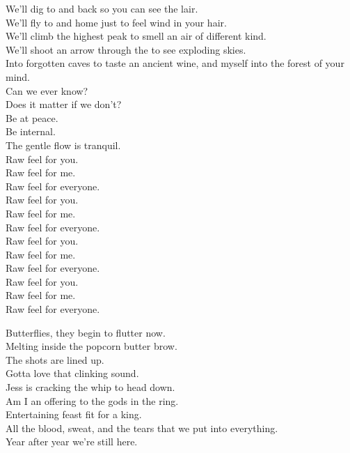 We'll dig to  and back so you can see the  lair. \\
We'll fly to  and home just to feel wind in your hair. \\
We'll climb the highest peak to smell an air of different kind. \\
We'll shoot an arrow through the  to see exploding skies. \\
Into forgotten caves to taste an ancient wine, and  myself into the forest of your mind. \\
Can we ever know? \\
Does it matter if we don't? \\
Be at peace. \\
Be internal. \\
The gentle flow is tranquil. \\

Raw feel for you. \\
Raw feel for me. \\
Raw feel for everyone. \\
Raw feel for you. \\
Raw feel for me. \\
Raw feel for everyone. \\
Raw feel for you. \\
Raw feel for me. \\
Raw feel for everyone. \\
Raw feel for you. \\
Raw feel for me. \\
Raw feel for everyone. \\



Butterflies, they begin to flutter now. \\
Melting inside the popcorn butter brow. \\
The shots are lined up. \\
Gotta love that clinking sound. \\
Jess is cracking the whip to head down. \\

Am I an offering to the gods in the ring. \\
Entertaining feast fit for a king. \\
All the blood, sweat, and the tears that we put into everything. \\
Year after year we're still here. \\

